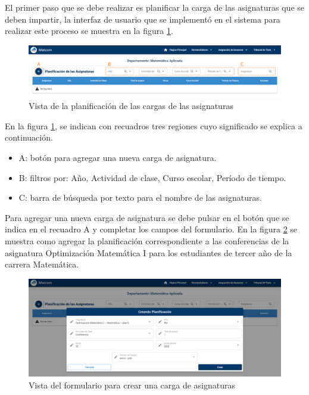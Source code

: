 El primer paso que se debe realizar es planificar la carga de las asignaturas 
que se deben impartir, la interfaz de usuario que se implementó en el sistema para realizar 
este proceso se muestra en la figura \ref{img-pd-example}.

\begin{figure}[H]
    \includegraphics[scale=0.3]{Graphics/Implementation/Docencia/PD-empty.png}
    \caption{Vista de la planificación de las cargas de las asignaturas}
    \label{img-pd-example}
\end{figure}


En la figura \ref{img-pd-example},
se indican con recuadros tres regiones cuyo significado se explica a continuación.

\begin{itemize}
    \item A: botón para agregar una nueva carga de asignatura.
    \item B: filtros por: Año, Actividad de clase, Curso escolar, Período de tiempo.
    \item C: barra de búsqueda por texto para el nombre de las asignaturas. 
\end{itemize}


Para agregar una nueva carga de asignatura se debe pulsar en el 
botón que se indica en el recuadro A y completar los campos del formulario. 
En la figura \ref{img-pd-form} se muestra como agregar la planificación
correspondiente a las conferencias de la asignatura Optimización
Matemática I para los estudiantes de tercer año de la carrera Matemática. 

\begin{figure}[H]
    \includegraphics[scale=0.3]{Graphics/Implementation/Docencia/PD-form.png}
    \caption{Vista del formulario para crear una carga de asignaturas}
    \label{img-pd-form}
\end{figure}


